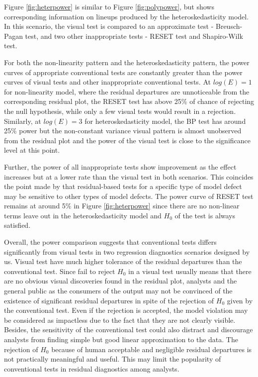 \documentclass[]{interact}
\theoremstyle{plain}%
\theoremstyle{definition}
\theoremstyle{remark}
\begin{document}
Figure \ref{fig:heterpower} is similar to Figure \ref{fig:polypower},
but shows corresponding information on lineups produced by the
heteroskedasticity model. In this scenario, the visual test is compared
to an approximate test - Breusch-Pagan test, and two other inappropriate
tests - RESET test and Shapiro-Wilk test.

For both the non-linearity pattern and the heteroskedasticity pattern,
the power curves of appropriate conventional tests are constantly
greater than the power curves of visual tests and other inappropriate
conventional tests. At \(log(E) = 1\) for non-linearity model, where the
residual departures are unnoticeable from the corresponding residual
plot, the RESET test has above 25\% of chance of rejecting the null
hypothesis, while only a few visual tests would result in a rejection.
Similarly, at \(log(E) = 3\) for heteroskedasticity model, the BP test
has around 25\% power but the non-constant variance visual pattern is
almost unobserved from the residual plot and the power of the visual
test is close to the significance level at this point.

Further, the power of all inappropriate tests show improvement as the
effect increases but at a lower rate than the visual test in both
scenarios. This coincides the point made by \citet{cook1982residuals}
that residual-based tests for a specific type of model defect may be
sensitive to other types of model defects. The power curve of RESET test
remains at around 5\% in Figure \ref{fig:heterpower} since there are no
non-linear terms leave out in the heteroskedasticity model and \(H_0\)
of the test is always satisfied.

Overall, the power comparison suggests that conventional tests differs
significantly from visual tests in two regression diagnostics scenarios
designed by us. Visual test have much higher tolerance of the residual
departures than the conventional test. Since fail to reject \(H_0\) in a
visual test usually means that there are no obvious visual discoveries
found in the residual plot, analysts and the general public as the
consumers of the output may not be convinced of the existence of
significant residual departures in spite of the rejection of \(H_0\)
given by the conventional test. Even if the rejection is accepted, the
model violation may be considered as impactless due to the fact that
they are not clearly visible. Besides, the sensitivity of the
conventional test could also distract and discourage analysts from
finding simple but good linear approximation to the data. The rejection
of \(H_0\) because of human acceptable and negligible residual
departures is not practically meaningful and useful. This may limit the
popularity of conventional tests in residual diagnostics among analysts.
\end{document}
